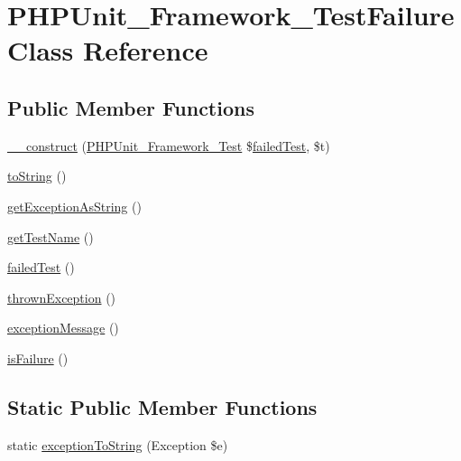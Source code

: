 \hypertarget{class_p_h_p_unit___framework___test_failure}{}\section{P\+H\+P\+Unit\+\_\+\+Framework\+\_\+\+Test\+Failure Class Reference}
\label{class_p_h_p_unit___framework___test_failure}
\subsection*{Public Member Functions}
\begin{DoxyCompactItemize}
\item 
\mbox{\hyperlink{class_p_h_p_unit___framework___test_failure_a8624bb999a77ed0efc6b0b7d6f1e532a}{\+\_\+\+\_\+construct}} (\mbox{\hyperlink{interface_p_h_p_unit___framework___test}{P\+H\+P\+Unit\+\_\+\+Framework\+\_\+\+Test}} \$\mbox{\hyperlink{class_p_h_p_unit___framework___test_failure_afb5353a5bb9ebe3f0b731d176a5f6019}{failed\+Test}}, \$t)
\item 
\mbox{\hyperlink{class_p_h_p_unit___framework___test_failure_a5558c5d549f41597377fa1ea8a1cefa3}{to\+String}} ()
\item 
\mbox{\hyperlink{class_p_h_p_unit___framework___test_failure_af5ab125fcd6e125ddf02594c56eadf8b}{get\+Exception\+As\+String}} ()
\item 
\mbox{\hyperlink{class_p_h_p_unit___framework___test_failure_af10615e21287d59c3ce1623fa03d79ac}{get\+Test\+Name}} ()
\item 
\mbox{\hyperlink{class_p_h_p_unit___framework___test_failure_afb5353a5bb9ebe3f0b731d176a5f6019}{failed\+Test}} ()
\item 
\mbox{\hyperlink{class_p_h_p_unit___framework___test_failure_a957f1cb5c23dde4acd265af6a43c87a7}{thrown\+Exception}} ()
\item 
\mbox{\hyperlink{class_p_h_p_unit___framework___test_failure_acb00ff713fcfbba6ef26c985232d5d28}{exception\+Message}} ()
\item 
\mbox{\hyperlink{class_p_h_p_unit___framework___test_failure_aca7c2d13862869a3538adf2d6a8fc4f5}{is\+Failure}} ()
\end{DoxyCompactItemize}
\subsection*{Static Public Member Functions}
\begin{DoxyCompactItemize}
\item 
static \mbox{\hyperlink{class_p_h_p_unit___framework___test_failure_a987dbaadef3643220df0860dc3b273e3}{exception\+To\+String}} (Exception \$e)
\end{DoxyCompactItemize}
